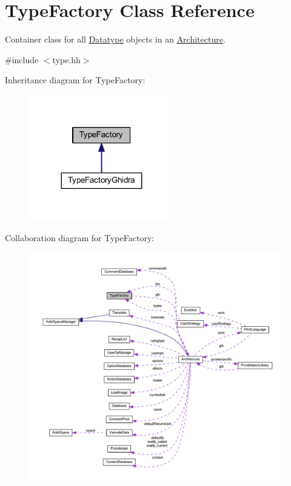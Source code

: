 \hypertarget{class_type_factory}{}\section{Type\+Factory Class Reference}
\label{class_type_factory}


Container class for all \mbox{\hyperlink{class_datatype}{Datatype}} objects in an \mbox{\hyperlink{class_architecture}{Architecture}}.  




{\ttfamily \#include $<$type.\+hh$>$}



Inheritance diagram for Type\+Factory\+:
\nopagebreak
\begin{figure}[H]
\begin{center}
\leavevmode
\includegraphics[width=179pt]{class_type_factory__inherit__graph}
\end{center}
\end{figure}


Collaboration diagram for Type\+Factory\+:
\nopagebreak
\begin{figure}[H]
\begin{center}
\leavevmode
\includegraphics[width=350pt]{class_type_factory__coll__graph}
\end{center}
\end{figure}

